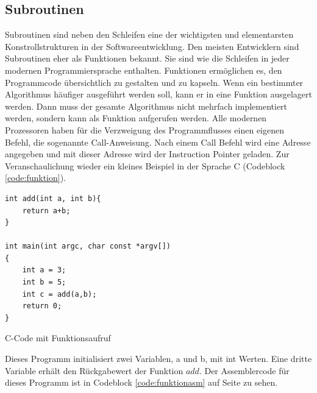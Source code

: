 \documentclass[a4paper,12pt]{article}
\begin{document}
\subsection{Subroutinen} \label{subsec:subroutinen}
Subroutinen sind neben den Schleifen eine der wichtigsten und elementarsten Konstrollstrukturen in der Softwareentwicklung. Den meisten Entwicklern sind Subroutinen eher als Funktionen bekannt. Sie sind wie die Schleifen in jeder modernen Programmiersprache enthalten. Funktionen ermöglichen es, den Programmcode übersichtlich zu gestalten und zu kapseln. Wenn ein bestimmter Algorithmus häufiger ausgeführt werden soll, kann er in eine Funktion ausgelagert werden. Dann muss der gesamte Algorithmus nicht mehrfach implementiert werden, sondern kann als Funktion aufgerufen werden. Alle modernen Prozessoren haben für die Verzweigung des Programmflusses einen eigenen Befehl, die sogenannte Call-Anweisung. Nach einem Call Befehl wird eine Adresse angegeben und mit dieser Adresse wird der Instruction Pointer geladen. Zur Veranschaulichung wieder ein kleines Beispiel in der Sprache C (Codeblock \ref{code:funktion}).  

\begin{code}[!htb]
\begin{lstlisting}
int add(int a, int b){
	return a+b;
}

int main(int argc, char const *argv[])
{
	int a = 3;
	int b = 5;
	int c = add(a,b); 
	return 0;
}
\end{lstlisting}
\caption[C Code Funktionen]{C-Code mit Funktionsaufruf}
\label{code:funktion}
\end{code}

\noindent Dieses Programm initialisiert zwei Variablen, a und b, mit int Werten. Eine dritte Variable erhält den Rückgabewert der Funktion $add$. Der Assemblercode für dieses Programm ist in Codeblock \ref{code:funktionasm} auf Seite \pageref{code:funktionasm} zu sehen. 
 
\end{document}
